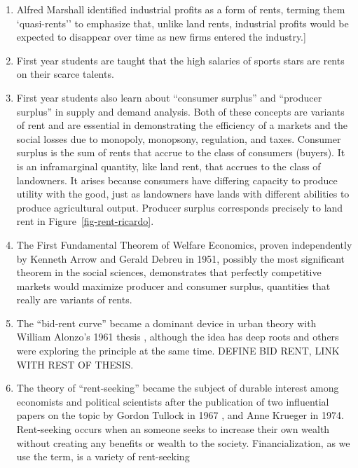 \begin{enumerate}
    \item Alfred Marshall identified industrial profits as a form of rents, terming them `quasi-rents'' to emphasize that, unlike land rents, industrial profits would  be expected to disappear over time as new firms entered the industry.]
    \item First year students are taught that the high salaries of  sports stars are rents on their scarce talents. 
    \item First year students also learn about ``consumer surplus'' and ``producer surplus'' in supply and demand analysis. Both of these concepts are variants of rent and are essential in demonstrating the efficiency of a markets and the social losses due to monopoly, monopsony, regulation, and taxes. Consumer surplus is the sum of rents that accrue to the class of consumers (buyers). It is an inframarginal quantity, like land  rent, that accrues to the class of landowners. It arises because consumers have differing capacity to produce  utility with the good, just as landowners have lands with different abilities to produce agricultural output. Producer surplus corresponds precisely to land rent in Figure~\ref{fig-rent-ricardo}.  
    \item The First Fundamental Theorem of Welfare Economics, proven independently by Kenneth Arrow \cite{arrowExtensionBasicTheorems1951}and  Gerald Debreu \cite{debreuCoefficientResourceUtilization1951}  in 1951, possibly the most significant theorem in the social sciences,   demonstrates that perfectly competitive markets would maximize producer and consumer surplus, quantities that really are variants of rents.
    \item The ``\gls{bid-rent curve}'' became a dominant device  in urban theory with William Alonzo's 1961 thesis \cite{alonzoTheoryUrbanLand1960}, although the idea has deep roots and others were exploring the principle at the same time.  DEFINE BID RENT, LINK WITH REST OF THESIS.
    \item The theory of ``\gls{rent-seeking}''   became the subject of durable interest among economists and political scientists after the publication of two influential papers on the topic by Gordon Tullock in 1967 \cite{tullockWelfareCostsTariffs1967}, and Anne Krueger \cite{kruegerPoliticalEconomyRentSeeking1974} in 1974. Rent-seeking occurs when an someone seeks to increase their own wealth without creating any benefits or wealth to the society. Financialization, as we use the term, is a variety of rent-seeking
\end{enumerate}


